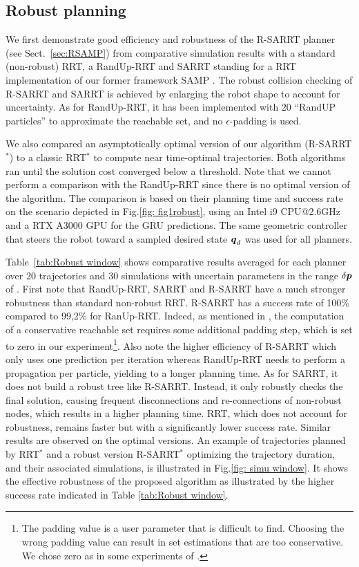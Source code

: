 \subsection{Robust planning} \label{results:RobustEval}

We first demonstrate good efficiency and robustness of the R-SARRT planner (see Sect.~\ref{sec:RSAMP}) from comparative simulation results with a standard (non-robust) RRT, a RandUp-RRT \cite{cRandUpRRT} and SARRT standing for a RRT implementation of our former framework SAMP \cite{cSAMP}.
The robust collision checking of R-SARRT and SARRT is achieved by enlarging the robot shape to account for uncertainty. 
As for RandUp-RRT, it has been implemented with 20 ``RandUP particles'' to approximate the reachable set, and no $\epsilon$-padding is used.

We also compared an asymptotically optimal version of our algorithm (R-SARRT$^*$) to 
a classic RRT$^*$ to compute near time-optimal trajectories. 
Both algorithms ran until the solution cost converged below a threshold.
Note that we cannot perform a comparison with the RandUp-RRT since there is no optimal version of the algorithm. 
The comparison is based on their planning time and success rate on the scenario depicted in Fig.\ref{fig: fig1robust}, using an Intel i9 CPU@2.6GHz and a RTX A3000 GPU for the GRU predictions.
The same geometric controller that steers the robot toward a sampled desired state $\boldsymbol{q}_d$ was used for all planners.

Table~\ref{tab:Robust window} shows comparative results averaged for each planner over 20 trajectories and 30 simulations with uncertain parameters in the range $\delta\boldsymbol{p}$ of . 
First note that RandUp-RRT, SARRT and R-SARRT have a much stronger robustness than standard non-robust RRT. 
R-SARRT has a success rate of 100\% compared to 99,2\% for RanUp-RRT. 
Indeed, as mentioned in \cite{cRandUpRRT, cRandUP}, the computation of a conservative reachable set requires some additional padding step, which is set to zero in our experiment\footnote{The padding value is a user parameter that is difficult to find. Choosing the wrong padding value can result in set estimations that are too conservative. We chose zero as in some experiments of \cite{cRandUpRRT}.}. 
Also note the higher efficiency of R-SARRT which only uses one prediction per iteration whereas RandUp-RRT needs to perform a propagation per particle, yielding to a longer planning time. 
As for SARRT, it does not build a robust tree like R-SARRT. Instead, it only robustly checks the final solution, causing frequent disconnections and re-connections of non-robust nodes, which results in a higher planning time.
RRT, which does not account for robustness, remains faster but with a significantly lower success rate. 
Similar results are observed on the optimal versions. 
An example of trajectories planned by RRT$^*$ and a robust version R-SARRT$^*$ optimizing the trajectory duration, and their associated simulations, is illustrated in Fig.\ref{fig: simu window}.
It shows the effective robustness of the proposed algorithm as illustrated by the higher success rate indicated in Table \ref{tab:Robust window}.

